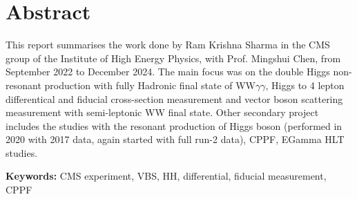 \chapter*{Abstract}

This report summarises the work done by Ram Krishna Sharma in the CMS group of the Institute of High Energy Physics,
with Prof. Mingshui Chen, from September 2022 to December 2024.
The main focus was on the double Higgs non-resonant production with fully Hadronic final state
of WW$\gamma \gamma$, Higgs to 4 lepton differentical and fiducial cross-section measurement
and vector boson scattering measurement with semi-leptonic WW final state.
Other secondary project includes the studies with the resonant production of Higgs boson
(performed in 2020 with 2017 data, again started with full run-2 data), CPPF, EGamma HLT studies.

\vspace*{2em}

\noindent \textbf{Keywords:} {CMS experiment, VBS, HH, differential, fiducial measurement, CPPF}
